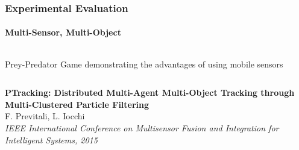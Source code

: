 \begin{frame}
	\frametitle{Experimental Evaluation}
	\framesubtitle{Multi-Sensor, Multi-Object}
	
	\large
	
	\begin{columns}[t]
		{
			
			\begin{block}{Prey-Predator Game}
				demonstrating the advantages of using mobile sensors
			\end{block}
			
		}
	\end{columns}
	
	\vspace{0.1cm}
	
	\begin{center}
	\end{center}
	
	\vspace{0.52cm}
	
	\tiny
	
	\textbf{PTracking: Distributed Multi-Agent Multi-Object Tracking through Multi-Clustered Particle
	Filtering} \\
	F. Previtali, L. Iocchi \\
	\emph{IEEE International Conference on Multisensor Fusion and Integration for Intelligent Systems,
	2015} \\
\end{frame}

